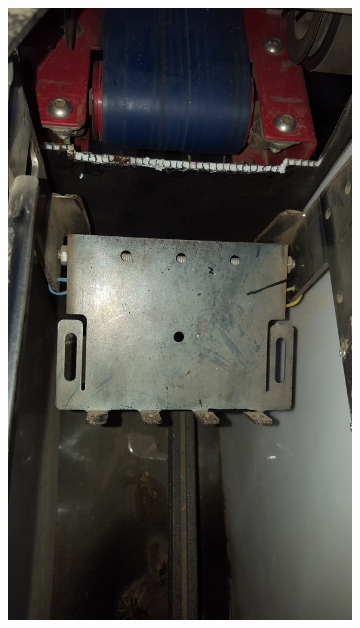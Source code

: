 \documentclass[fleqn,twoside]{article}
\begin{document}
\begin{figure}[ht]
	\centering
	\begin{subfigure}{.5\textwidth}
		\centering
		\includegraphics[width=\linewidth, angle=270]{inside_enclosure_1.jpg}
		\caption{}
		\label{fig:inside_enclosure_1}
	\end{subfigure}%
	\begin{subfigure}{.5\textwidth}
		\centering

\end{subfigure}
\end{figure}
\end{document}

